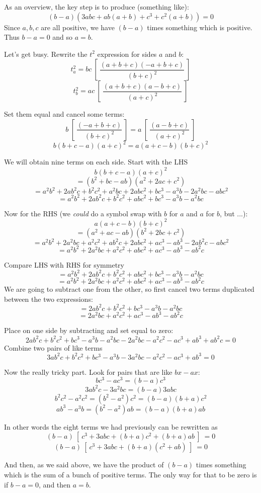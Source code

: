 \documentclass[11pt, oneside]{article}
\begin{document}
As an overview, the key step is to produce (something like):
\[ (b-a)(3 abc + ab(a + b) + c^3 + c^2(a+b)) = 0 \]
Since $a,b,c$ are all positive, we have $(b-a)$ times something which is positive.  Thus $b - a = 0$ and so $a = b$.

Let's get busy.  Rewrite the $t^2$ expression for sides $a$ and $b$:
\[ t_a^2 = bc \ [ \ \frac{(a + b + c)(-a + b + c)}{(b+c)^2} \ ]  \]
\[ t_b^2 = ac \ [ \ \frac{(a + b + c)(a - b + c)}{(a+c)^2} \ ]  \]

Set them equal and cancel some terms:
\[ b \ [ \ \frac{(-a + b + c)}{(b+c)^2} \ ] = a \ [ \ \frac{(a - b + c)}{(a+c)^2} \ ]  \]
\[ b(b + c - a)(a + c)^2 = a(a + c - b)(b+c)^2 \]

We will obtain nine terms on each side.  Start with the LHS
\[ b(b + c - a)(a + c)^2 \]
\[ = (b^2 + bc - ab)(a^2 + 2ac + c^2) \]
\[ = a^2b^2 + 2ab^2c + b^2c^2 + a^2bc + 2abc^2 + bc^3 - a^3b - 2a^2bc - abc^2 \]
\[ = a^2b^2 + 2ab^2c + b^2c^2 + abc^2 + bc^3 - a^3b - a^2bc \]

Now for the RHS (we \emph{could} do a symbol swap with $b$ for $a$ and $a$ for $b$, but ...):
\[ a(a + c - b)(b+c)^2 \]
\[ = ( a^2 + ac - ab)(b^2 + 2bc + c^2) \]
\[ = a^2b^2 + 2a^2bc + a^2c^2 + ab^2c + 2abc^2 + ac^3 - ab^3 - 2ab^2c - abc^2 \]
\[ = a^2b^2 + 2a^2bc + a^2c^2 + abc^2 + ac^3 - ab^3 - ab^2c \]

Compare LHS with RHS for symmetry
\[ = a^2b^2 + 2ab^2c + b^2c^2 + abc^2 + bc^3 - a^3b - a^2bc \]
\[ = a^2b^2 + 2a^2bc + a^2c^2 + abc^2 + ac^3 - ab^3 - ab^2c \]
We are going to subtract one from the other, so first cancel two terms duplicated between the two expressions:
\[ = 2ab^2c + b^2c^2 + bc^3 - a^3b - a^2bc \]
\[ = 2a^2bc + a^2c^2 + ac^3 - ab^3 - ab^2c \]

Place on one side by subtracting and set equal to zero:
\[ 2ab^2c + b^2c^2 + bc^3 - a^3b - a^2bc - 2a^2bc - a^2c^2 - ac^3 + ab^3 + ab^2c = 0 \]
Combine two pairs of like terms
\[ 3ab^2c + b^2c^2 + bc^3 - a^3b - 3a^2bc - a^2c^2 - ac^3 + ab^3 = 0 \]

Now the really tricky part.  Look for pairs that are like $bx-ax$:
\[ bc^3 - ac^3 = (b-a)c^3 \]
\[ 3ab^2c - 3a^2bc = (b-a)3abc \]
\[ b^2c^2 - a^2c^2 = (b^2 - a^2)c^2 = (b-a)(b+a)c^2  \]
\[  ab^3 - a^3b = (b^2 - a^2)ab = (b-a)(b+a)ab \]

In other words the eight terms we had previously can be rewritten as
\[ (b-a) \ [ \ c^3 + 3abc + (b+a)c^2 + (b+a)ab \ ] \ = 0 \]
\[ (b-a) \ [ \ c^3 + 3abc + (b+a)(c^2 + ab) \ ] \ = 0 \]

And then, as we said above, we have the product of $(b-a)$ times something which is the sum of a bunch of positive terms.  The only way for that to be zero is if $b - a = 0$, and then $a = b$.
\end{document}
